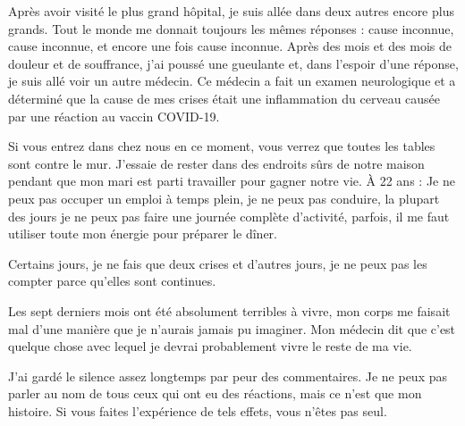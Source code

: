 {Après avoir visité le plus grand hôpital, je suis allée dans deux autres encore
plus grands. Tout le monde me donnait toujours les mêmes réponses : cause
inconnue, cause inconnue, et encore une fois cause inconnue. Après des mois et
des mois de douleur et de souffrance, j'ai poussé une gueulante et, dans
l'espoir d'une réponse, je suis allé voir un autre médecin. Ce médecin a fait un
examen neurologique et a déterminé que la cause de mes crises était une
inflammation du cerveau causée par une réaction au vaccin COVID-19.

Si vous entrez dans chez nous en ce moment, vous verrez que toutes les tables
sont contre le mur. J'essaie de rester dans des endroits sûrs de notre maison
pendant que mon mari est parti travailler pour gagner notre vie. À 22 ans : Je
ne peux pas occuper un emploi à temps plein, je ne peux pas conduire, la plupart
des jours je ne peux pas faire une journée complète d'activité, parfois, il me
faut utiliser toute mon énergie pour préparer le dîner.

Certains jours, je ne fais que deux crises et d'autres jours, je ne peux pas les
compter parce qu'elles sont continues.

Les sept derniers mois ont été absolument terribles à vivre, mon corps me
faisait mal d'une manière que je n'aurais jamais pu imaginer. Mon médecin dit
que c'est quelque chose avec lequel je devrai probablement vivre le reste de ma
vie.

J'ai gardé le silence assez longtemps par peur des commentaires. Je ne peux pas
parler au nom de tous ceux qui ont eu des réactions, mais ce n'est que mon
histoire. Si vous faites l'expérience de tels effets, vous n'êtes pas seul.

}

